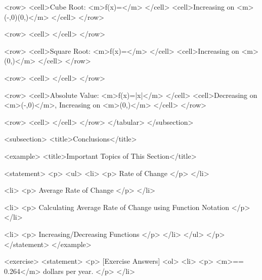             <row>
                <cell>Cube Root: <m>f(x)=</m> </cell>
                <cell>Increasing on <m>(-\infty,0)\cup(0,\infty)</m> </cell>
            </row>

            <row>
                <cell> </cell>
            </row>

            <row>
                <cell>Square Root: <m>f(x)=</m> </cell>
                <cell>Increasing on <m>(0,\infty)</m> </cell>
            </row>

            <row>
                <cell> </cell>
            </row>

            <row>
                <cell>Absolute Value: <m>f(x)=|x|</m> </cell>
                <cell>Decreasing on <m>(-\infty,0)</m>, Increasing on <m>(0,\infty)</m> </cell>
            </row>

            <row>
                <cell> </cell>
            </row>
        </tabular>
    </subsection>


    <subsection>
        <title>Conclusions</title>

        <example>
            <title>Important Topics of This Section</title>

            <statement>
                <p>
                    <ul>
                        <li>
                            <p>
                                Rate of Change
                            </p>
                        </li>

                        <li>
                            <p>
                                Average Rate of Change
                            </p>
                        </li>

                        <li>
                            <p>
                                Calculating Average Rate of Change using Function Notation
                            </p>
                        </li>

                        <li>
                            <p>
                                Increasing/Decreasing Functions
                            </p>
                        </li>
                    </ul>
                </p>
            </statement>
        </example>

        <exercise>
            <statement>
                <p>
                    [Exercise Answers]
                    <ol>
                        <li>
                            <p>
                                <m>== 0.264</m> dollars per year.
                            </p>
                        </li>

